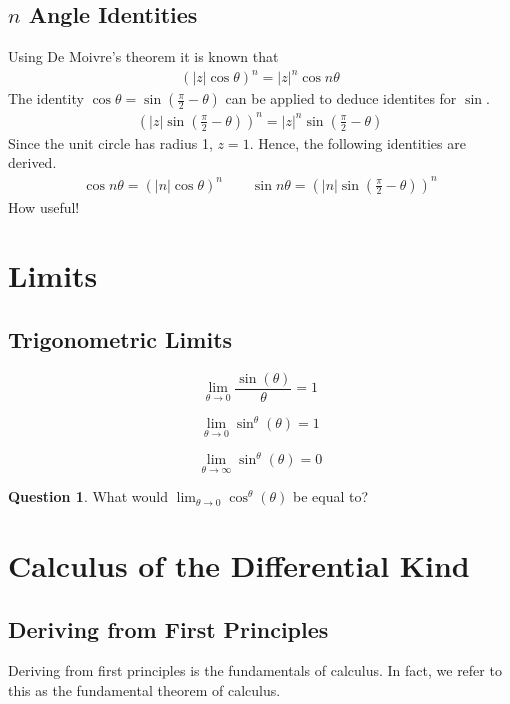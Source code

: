 \documentclass[a4paper]{article}
\theoremstyle{plain}
\theoremstyle{definition}
\newtheorem{question}{Question}[section]
\theoremstyle{remark}
\newcommand{\sectionSpace}{\vspace{2em}} %
\begin{document}
    \subsection{$n$ Angle Identities}
    Using De Moivre's theorem it is known that
    \begin{align}
        (|z|\cos{\theta})^n=|z|^n\cos{n\theta}
    \end{align}
    The identity $\cos{\theta}=\sin{\left(\frac{\pi}{2}-\theta \right)}$ can be applied to deduce identites for $\sin$.
    \begin{align}
        \left(|z|\sin{\left(\frac{\pi}{2}-\theta \right)}\right)^n=|z|^n\sin{\left(\frac{\pi}{2}-\theta \right)}
    \end{align}
    Since the unit circle has radius 1, $z=1$. Hence, the following identities are derived.
    \begin{align}
        \cos{n\theta}=(|n|\cos{\theta})^n\qquad \sin{n\theta}=\left(|n|\sin{\left(\frac{\pi}{2}-\theta \right)}\right)^n
    \end{align}
    How useful!



\sectionSpace
\section{Limits}
    \subsection{Trigonometric Limits}
    $$\lim_{\theta \to 0} \frac{\sin(\theta)}{\theta} = 1$$

    $$\lim_{\theta \to 0} \sin^{\theta}(\theta) = 1$$

    \[\lim_{\theta \to \infty} \sin^{\theta}(\theta) = 0\]

    \begin{question}
        What would $\lim_{\theta \to 0} \cos^{\theta}(\theta)$ be equal to?
    \end{question}

\sectionSpace
\section{Calculus of the Differential Kind}
    \subsection{Deriving from First Principles}
    Deriving from first principles is the fundamentals of calculus. In fact, we refer to this as the fundamental theorem of calculus.
\end{document}
